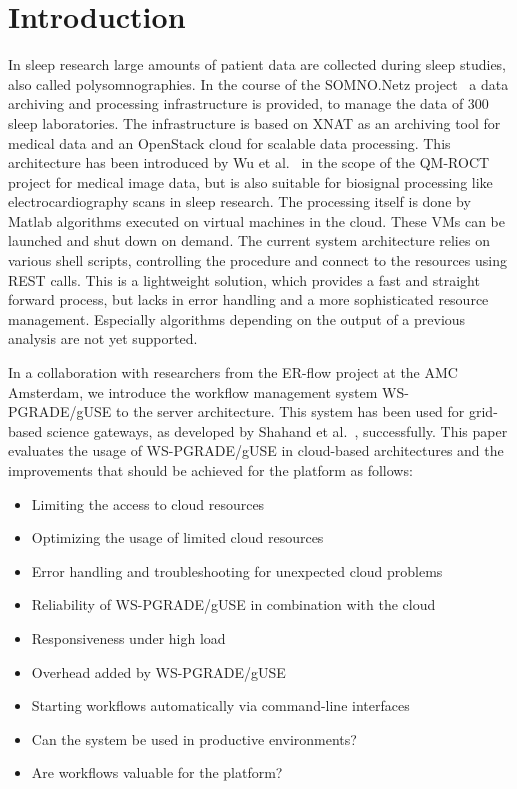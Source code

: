 \section{Introduction}\label{introduction}

In sleep research large amounts of patient data are collected during sleep studies, also called polysomnographies.
In the course of the SOMNO.Netz project~\cite{krefting13} a data archiving and processing infrastructure is provided, to manage the data of 300 sleep laboratories.
The infrastructure is based on XNAT as an archiving tool for medical data and an OpenStack cloud for scalable data processing.
This architecture has been introduced by Wu et al.~\cite{wu14} in the scope of the QM-ROCT project for medical image data, but is also suitable for biosignal processing like electrocardiography scans in sleep research.
The processing itself is done by Matlab algorithms executed on virtual machines in the cloud. These VMs can be launched and shut down on demand.
The current system architecture relies on various shell scripts, controlling the procedure and connect to the resources using REST calls.
This is a lightweight solution, which provides a fast and straight forward process, but lacks in error handling and a more sophisticated resource management.
Especially algorithms depending on the output of a previous analysis are not yet supported.

In a collaboration with researchers from the ER-flow project at the AMC Amsterdam, we introduce the workflow management system WS-PGRADE/gUSE to the server architecture. This system has been used for grid-based science gateways, as developed by Shahand et al.~\cite{shahand13}, successfully.
This paper evaluates the usage of WS-PGRADE/gUSE in cloud-based architectures and the improvements that should be achieved for the platform as follows:

\begin{itemize}
\item Limiting the access to cloud resources
\item Optimizing the usage of limited cloud resources
\item Error handling and troubleshooting for unexpected cloud problems
\item Reliability of WS-PGRADE/gUSE in combination with the cloud
\item Responsiveness under high load
\item Overhead added by WS-PGRADE/gUSE
\item Starting workflows automatically via command-line interfaces
\item Can the system be used in productive environments?
\item Are workflows valuable for the platform?
\end{itemize}